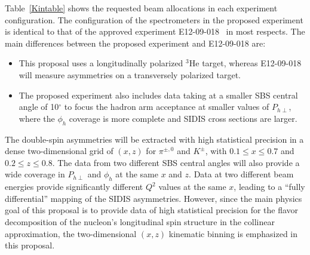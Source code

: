 Table~\ref{Kintable} shows the requested beam allocations in each experiment configuration. The configuration of the spectrometers in the proposed experiment is identical to that of the approved experiment E12-09-018~\cite{SBS_SIDIS} in most respects. The main differences between the proposed experiment and E12-09-018 are: 
\begin{itemize}
\item This proposal uses a longitudinally polarized $^3$He target, whereas E12-09-018 will measure asymmetries on a transversely polarized target. 
\item The proposed experiment also includes data taking at a smaller SBS central angle of 10$^\circ$ to focus the hadron arm acceptance at smaller values of $P_{h\perp}$, where the $\phi_h$ coverage is more complete and SIDIS cross sections are larger. 
\end{itemize}
The double-spin asymmetries will be extracted with high statistical precision in a dense two-dimensional grid of $(x,z)$ for $\pi^{\pm,0}$ and $K^\pm$, with $0.1 \le x \le 0.7$ and $0.2 \le z \le 0.8$. The data from two different SBS central angles will also provide a wide coverage in $P_{h\perp}$ and $\phi_h$ at the same $x$ and $z$. Data at two different beam energies provide significantly different $Q^2$ values at the same $x$, leading to a ``fully differential'' mapping of the SIDIS asymmetries. However, since the main physics goal of this proposal is to provide data of high statistical precision for the flavor decomposition of the nucleon's longitudinal spin structure in the collinear approximation, the two-dimensional $(x,z)$ kinematic binning is emphasized in this proposal.

